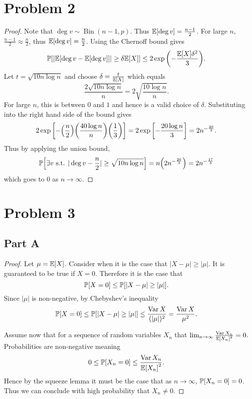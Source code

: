 \documentclass{eeleyes}
\begin{document}
\section*{Problem 2}
\begin{proof}
    Note that $\deg v \sim \operatorname{Bin}(n-1,p)$. Thus $\expp{\deg v} = \frac{n-1}{2}$. For large $n$, $\frac{n - 1}{2} \approx \frac{n}{2}$, thus $\expp{\deg v} = \frac{n}{2}$. Using the Chernoff bound gives
    \[
        \prob{|\expp{\deg v - \expp{\deg v}}| \geq \delta \expp{X}} \leq 2 \exp\qty(-\frac{\expp{X} \delta^2}{3})
    .\]
    Let $t = \sqrt{10 n \log n}$ and choose $\delta = \frac{t}{\expp{X}}$ which equals
    \[
        \frac{2 \sqrt{10 n \log n}}{n} = 2 \sqrt{\frac{10 \log n}{n}}
    .\]
    For large $n$, this is between $0$ and $1$ and hence is a valid choice of $\delta$. Substituting into the right hand side of the bound gives
    \[
        2 \exp\qty[-\qty(\frac{n}{2})\qty(\frac{40 \log n}{n})\qty(\frac{1}{3})] = 2 \exp\qty[-\frac{20 \log n}{3}] = 2n^{-\frac{20}{3}}
    .\]
    Thus by applying the union bound,
    \[
        \prob{\exists v \text{ s.t. } |\deg v - \frac{n}{2}| \geq \sqrt{10 n \log n}} = n \qty(2n^{- \frac{20}{3}}) = 2n^{-\frac{17}{3}}
    \]
    which goes to $0$ as $n \to \infty$.
\end{proof}

\section*{Problem 3}
\subsection*{Part A}
\begin{proof}
    Let $\mu = \expp{X}$. Consider when it is the case that $|X - \mu| \geq |\mu|$. It is guaranteed to be true if $X = 0$. Therefore it is the case that
    \[
        \prob{X = 0} \leq \prob{|X - \mu| \geq |\mu|}
    .\]
    Since $|\mu|$ is non-negative, by Chebyshev's inequality
    \[
        \prob{X = 0} \leq \prob{|X - \mu| \geq |\mu|} \leq \frac{\varr X}{(|\mu|)^2} = \frac{\varr X}{\mu^2}
    .\]

    Assume now that for a sequence of random variables $X_n$ that $\lim_{n \to \infty} \frac{\varr X_n}{\expp{X_n}^2} = 0$. Probabilities are non-negative meaning
    \[
        0 \leq \prob{X_n = 0} \leq \frac{\varr{X_n}}{\expp{X_n}^2}
    .\]
    Hence by the squeeze lemma it must be the case that as $n \to \infty$, $\prob{X_n = 0} = 0$. Thus we can conclude with high probability that $X_n \neq 0$.
\end{proof}
\end{document}
